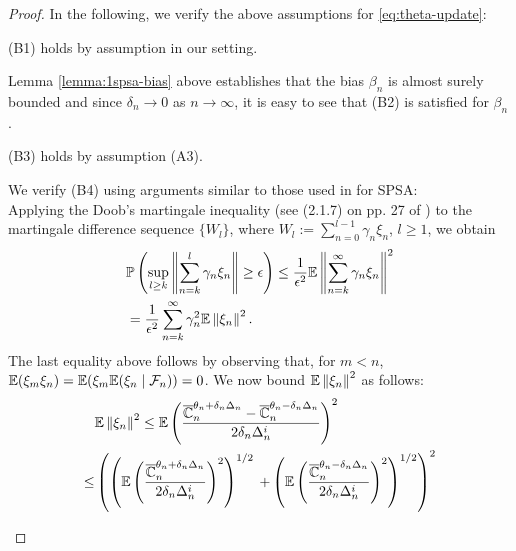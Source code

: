 \begin{proof}
In the following, we verify the above assumptions for \eqref{eq:theta-update}:\\
\begin{inparaenum}[$\bullet$]
\item (B1) holds by assumption in our setting.\\
\item Lemma \ref{lemma:1spsa-bias} above establishes that the bias $\beta_n$ is almost surely bounded and since $\delta_n \rightarrow 0$ as $n\rightarrow \infty$, it is easy to see that (B2) is satisfied for $\beta_n$. \\
\item (B3) holds by assumption (A3).\\
\item We verify (B4) using arguments similar to those used in \cite{spall} for SPSA:\\
Applying the Doob's martingale inequality (see (2.1.7) on pp. 27 of \cite{kushner-clark}) to the martingale difference sequence $\{W_l\}$, where  $W_l := \sum_{n=0}^{l-1} \gamma_n \xi_n$, $l\ge 1$, we obtain
\begin{align}
&\mathbb{P}\left(  \sup_{l\geq k}   \left\|\sum_{n=k}^{l} \gamma_n \xi_n\right\| \geq \epsilon  \right) \le \dfrac{1}{\epsilon^2} \mathbb{E} \left\|
\sum_{n=k}^{\infty} \gamma_n \xi_n\right\|^2 \nonumber\\
&= \dfrac{1}{\epsilon^2} \sum_{n=k}^{\infty} \gamma_n^2 \mathbb{E}\left\| \xi_n\right\|^2. \label{eq:b4}
\end{align}
The last equality above follows by observing that, for $m < n$, $\mathbb{E}(\xi_m \xi_n) = \mathbb{E}(\xi_m \mathbb{E}(\xi_n\mid \mathcal{F}_n))=0$.
We now bound $\mathbb{E}\left\| \xi_n\right\|^2$ as follows:
\begin{align}
&\E\left\| \xi_n\right\|^2\le \E\left(\dfrac{\overline \C_n^{\theta_n + \delta_n \Delta_n} -\overline \C_n^{\theta_n - \delta_n \Delta_n}}{2 \delta_n \Delta_n^i}\right)^2 \label{eq:mi}\\
\le &\left(\left(\E\left(\dfrac{\overline \C_n^{\theta_n + \delta_n \Delta_n}}{2 \delta_n \Delta_n^i}\right)^2\right)^{1/2}\right. 
\left.+ \left(\E\left(\dfrac{\overline \C_n^{\theta_n - \delta_n \Delta_n}}{2 \delta_n \Delta_n^i}\right)^2\right)^{1/2}\right)^2 \label{eq:minko}\\

\end{align}
\end{inparaenum}
\end{proof}
